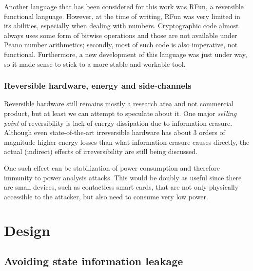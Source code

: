 \documentclass[a4paper,10pt,openright]{memoir}
\begin{document}
Another language that has been considered for this work was RFun, a 
reversible functional language. However, at the time of writing, RFun 
was very limited in its abilities, especially when dealing with 
numbers. Cryptographic code almost always uses some form of bitwise 
operations and those are not available under Peano number arithmetics; 
secondly, most of such code is also imperative, not functional. 
Furthermore, a new development of this language was just under way, so 
it made sense to stick to a more stable and workable tool.

\subsection{Reversible hardware, energy and side-channels}

Reversible hardware still remains mostly a research area and not 
commercial product, but at least we can attempt to speculate about it. 
One major \textit{selling point} of reversibility is lack of energy 
dissipation due to information erasure. Although even state-of-the-art 
irreversible hardware has about 3 orders of magnitude higher energy 
losses than what information erasure causes directly, the actual 
(indirect) effects of irreversibility are still being discussed.

One such effect can be stabilization of power consumption and therefore 
immunity to power analysis attacks. This would be doubly as useful 
since there are small devices, such as contactless smart cards, that 
are not only physically accessible to the attacker, but also need to 
consume very low power.




\chapter{Design}


\section{Avoiding state information leakage}
\end{document}

